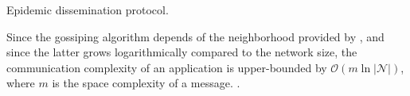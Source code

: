 \begin{algorithm}[h]
  
  \caption{\label{algo:gossiping}Epidemic dissemination protocol.}
\end{algorithm}

Since the gossiping algorithm depends of the neighborhood provided by \SPRAY,
and since the latter grows logarithmically compared to the network size, the
communication complexity of an application is upper-bounded by
$\mathcal{O}(m \ln |\mathcal{N}|)$, where $m$ is the space complexity of a
message. .

